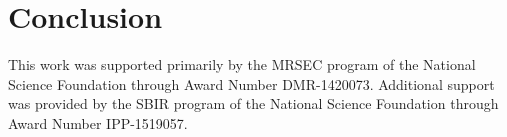 \section{Conclusion}


\begin{acknowledgement}

This work was supported primarily by the MRSEC program of
the National Science Foundation through Award Number DMR-1420073.
Additional support was provided by the SBIR program of the
National Science Foundation through Award Number IPP-1519057.

\end{acknowledgement}
